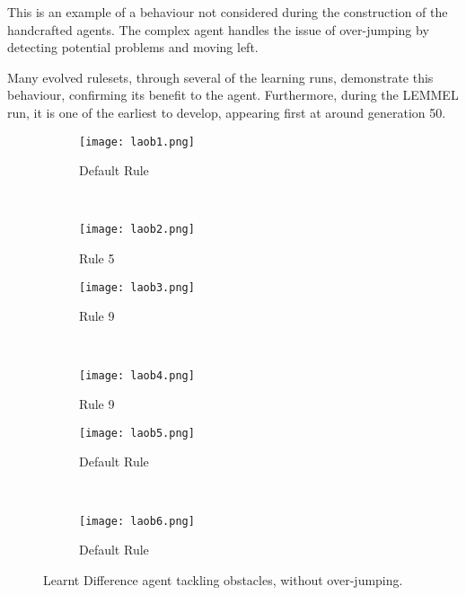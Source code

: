 This is an example of a behaviour not considered during the construction of the handcrafted agents. The complex agent handles the issue of over-jumping by detecting potential problems and moving left.

Many evolved rulesets, through several of the learning runs, demonstrate this behaviour, confirming its benefit to the agent. Furthermore, during the LEMMEL run, it is one of the earliest to develop, appearing first at around generation 50.

\clearpage

\begin{figure}[m]
	\begin{adjustwidth}{-2cm}{-2cm}
    \centering
          \begin{subfigure}[b]{0.49\textwidth}
                  \centering
                  \texttt{[image: laob1.png]}
                  \caption{Default Rule}
                  \vspace*{\baselineskip}
          \end{subfigure}~
          \begin{subfigure}[b]{0.49\textwidth}
                  \centering
                  \texttt{[image: laob2.png]}
                  \caption{Rule 5}
                  \vspace*{\baselineskip}
          \end{subfigure}
          \begin{subfigure}[b]{0.49\textwidth}
                  \centering
                  \texttt{[image: laob3.png]}
                  \caption{Rule 9}
                  \vspace*{\baselineskip}
          \end{subfigure}~
          \begin{subfigure}[b]{0.49\textwidth}
                  \centering
                  \texttt{[image: laob4.png]}
                  \caption{Rule 9}
                  \vspace*{\baselineskip}
          \end{subfigure}
          \begin{subfigure}[b]{0.49\textwidth}
                  \centering
                  \texttt{[image: laob5.png]}
                  \caption{Default Rule}
                  \vspace*{\baselineskip}
          \end{subfigure}~
          \begin{subfigure}[b]{0.49\textwidth}
                  \centering
                  \texttt{[image: laob6.png]}
                  \caption{Default Rule}
                  \vspace*{\baselineskip}
          \end{subfigure}
    \caption{Learnt Difference agent tackling obstacles, without over-jumping.}\label{fig:laob}
    \end{adjustwidth}
\end{figure}


